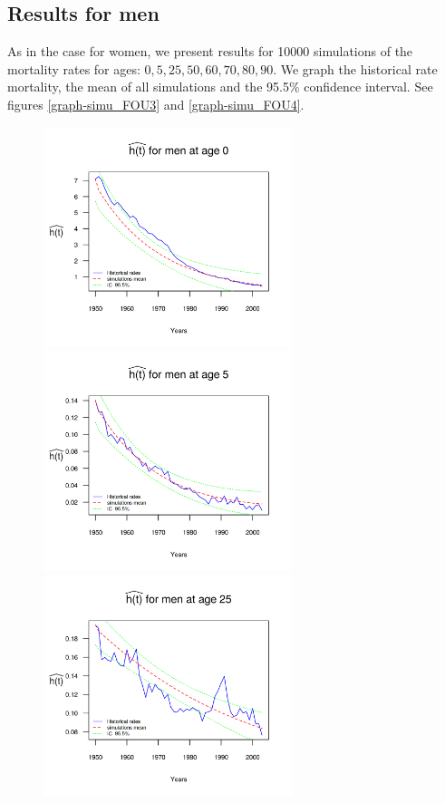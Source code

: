 \documentclass[12pt,reqno]{amsart}
\theoremstyle{definition}
\theoremstyle{remark}
\numberwithin{equation}{section}
\begin{document}
 \subsection{Results for men}\label{re-men}

As in the case for women, we present results for 10000 simulations of the mortality rates for ages: $0,5,25,50,60,70,80,90$.
We graph the historical rate mortality, the mean of all simulations and the 95.5\% confidence interval. See figures \ref{graph-simu_FOU3} and  \ref{graph-simu_FOU4}.\\



\begin{figure}[H]
\includegraphics[width = 2.85in]{PlotMen0.png}
\includegraphics[width = 2.85in]{PlotMen5.png}
\includegraphics[width = 2.85in]{PlotMen25.png}

\end{figure}
\end{document}
